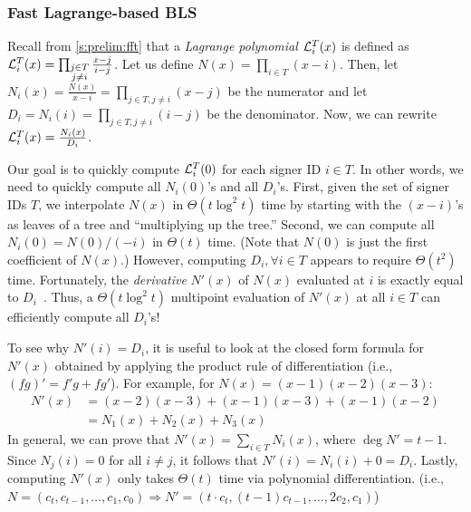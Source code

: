 \subsubsection{Fast Lagrange-based BLS}
\label{s:threshsig:fast-lagr}
Recall from \cref{s:prelim:fft} that a \textit{Lagrange polynomial} $\mathcal{L}_i^T(x)$ is defined as $\mathcal{L}_i^T(x) = \prod_{\substack{j\in T\\j\ne i}}\frac{x-j}{i-j}$.
Let us define $N(x) = \prod_{i\in T}{(x-i)}$.
Then, let $N_i(x) = \frac{N(x)}{x-i} = \prod_{j\in T,j\ne i} {(x-j)}$ be the numerator and let $D_i = N_i(i) = \prod_{j\in T,j\ne i} {(i - j)}$ be the denominator.
Now, we can rewrite $\mathcal{L}_i^T(x) = \frac{N_i(x)}{D_i}$.

Our goal is to quickly compute $\mathcal{L}_i^T(0)$ for each signer ID $i\in T$.
In other words, we need to quickly compute all $N_i(0)$'s and all $D_i$'s.
First, given the set of signer IDs $T$, we interpolate $N(x)$ in $\Theta(t\log^2{t})$ time by starting with the $(x-i)$'s as leaves of a tree and ``multiplying up the tree.''
Second, we can compute all $N_i(0) = N(0) / (-i)$ in $\Theta(t)$ time.
(Note that $N(0)$ is just the first coefficient of $N(x)$.)
However, computing $D_i,\forall i\in T$ appears to require $\Theta(t^2)$ time.
Fortunately, the \textit{derivative} $N'(x)$ of $N(x)$ evaluated at $i$ is exactly equal to $D_i$~\cite{moderncomputeralgebra-ch10}.
Thus, a $\Theta(t\log^2{t})$ multipoint evaluation of $N'(x)$ at all $i\in T$ can efficiently compute all $D_i$'s!

To see why $N'(i) = D_i$, it is useful to look at the closed form formula for $N'(x)$ obtained by applying the product rule of differentiation (i.e., $(fg)' = f'g + fg'$).
For example, for $N(x) = (x-1)(x-2)(x-3)$:
\begin{align*}
N'(x)
&= (x-2)(x-3) + (x-1)(x-3) + (x-1)(x-2)\\
&= N_1(x) + N_2(x) + N_3(x)
\end{align*}
In general, we can prove that $N'(x) = \sum_{i\in T} N_i(x)$, where $\deg{N'} = t-1$.
Since $N_j(i) = 0$ for all $i\ne j$, it follows that $N'(i) = N_i(i) + 0 = D_i$.
Lastly, computing $N'(x)$ only takes $\Theta(t)$ time via polynomial differentiation.
(i.e., $N = (c_t, c_{t-1}, \dots, c_1, c_0) \Rightarrow N' = (t \cdot c_t, (t-1) c_{t-1}, \dots, 2  c_2, c_1)$)

